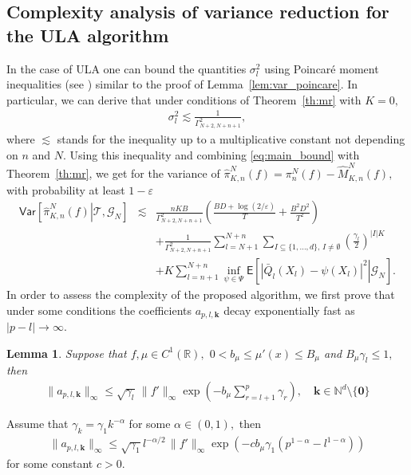 \documentclass[article]{elsarticle}
\def\NtrainPath{T}
\def\TrainSet{\mathcal{T}}
\newtheorem{lem}[thm]{Lemma}
\begin{document}
\subsection{Complexity analysis of variance reduction for the ULA algorithm}
In the case of ULA one can bound the quantities \(\sigma_l^2\) using  Poincar\'e moment inequalities  (see \cite{aida1994moment}) similar to the proof of Lemma~\ref{lem:var_poincare}.
In particular, we can derive that  under conditions of Theorem~\ref{th:mr} with \(K=0,\)
\begin{eqnarray*}
\sigma_l^2\lesssim \frac{1}{\Gamma^2_{N+2,N+n+1}},
\end{eqnarray*}
where \(\lesssim \) stands for the inequality up to a multiplicative constant not depending on \(n\) and \(N.\) Using this inequality and combining \eqref{eq:main_bound} with Theorem~\ref{th:mr}, we get for the variance of \(\widehat \pi_{K,n}^N(f)=\pi_n^N(f)-\widehat M_{K,n}^N(f),\) with probability at least \(1-\varepsilon\)
\begin{eqnarray}
\nonumber
\mathsf{Var}\left[\left.\widehat \pi_{K,n}^N(f)\right | \TrainSet, \mathcal{G}_N\right]&\lesssim & \frac{n KB}{\Gamma^2_{N+2,N+n+1}}
\left(\frac{BD+\log(2/\varepsilon)}{\NtrainPath}+\frac{B^2D^2}{\NtrainPath^2}\right)
\\
\nonumber
&& + \frac{1}{\Gamma^2_{N+2,N+n+1}}\sum_{l=N+1}^{N+n}\sum_{I\subseteq\{1,\ldots,d\},\, I\neq \emptyset}
\left(\frac{\gamma_{l}}{2}\right)^{|I|K}
\\
\label{eq:ula_red_var}
&& +
K \sum_{l=n+1}^{N+n}\inf_{\psi\in \Psi}
\mathsf{E}\left[\left.\left|\bar Q_l(X_{l})-\psi(X_{l})\right|^{2}\right | \mathcal{G}_N \right].
\end{eqnarray}
In order to assess the complexity of the proposed algorithm,  we first prove that under some conditions the coefficients \(a_{p,l,\mathbf{k}}\) decay exponentially fast as \(|p-l|\to \infty.\)
\begin{lem}
\label{a_decay}
Suppose that \(f,\mu\in C^1(\mathbb{R}),\) \(0<b_\mu\leq \mu'(x)\leq B_\mu\) and \(B_\mu\gamma_{l}\leq 1,\) then
\begin{eqnarray*}
\|a_{p,l,\mathbf{k}}\|_{\infty}\leq \sqrt{\gamma_l}\, \|f'\|_\infty\exp\left(-b_{\mu}\sum_{r=l+1}^p \gamma_{r}  \right),\quad \mathbf{k}\in \mathbb{N}^d\setminus \{\mathbf{0}\}
\end{eqnarray*}
\end{lem}
\begin{cor}
Assume that \(\gamma_k=\gamma_1 k^{-\alpha}\) for some \(\alpha\in (0,1),\) then
\begin{eqnarray*}
\|a_{p,l,\mathbf{k}}\|_{\infty}\leq \sqrt{\gamma_1} l^{-\alpha/2}\, \|f'\|_\infty\exp\left(-c b_{\mu}\gamma_1 (p^{1-\alpha}-l^{1-\alpha}) \right)
\end{eqnarray*}
for some constant \(c>0.\)
\end{cor}
\end{document}
